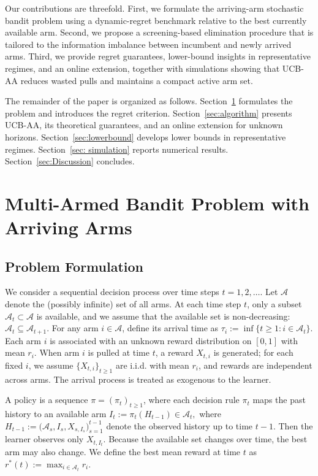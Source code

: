 \documentclass[
  12pt]{article}
\begin{document}
Our contributions are threefold. First, we formulate the arriving-arm stochastic bandit problem using a dynamic-regret benchmark relative to the best currently available arm. Second, we propose a screening-based elimination procedure that is tailored to the information imbalance between incumbent and newly arrived arms. Third, we provide regret guarantees, lower-bound insights in representative regimes, and an online extension, together with simulations showing that UCB-AA reduces wasted pulls and maintains a compact active arm set.

The remainder of the paper is organized as follows. Section~\ref{sec:problem} formulates the problem and introduces the regret criterion. Section~\ref{sec:algorithm} presents UCB-AA, its theoretical guarantees, and an online extension for unknown horizons. Section~\ref{sec:lowerbound} develops lower bounds in representative regimes. Section~\ref{sec: simulation} reports numerical results. Section~\ref{sec:Discussion} concludes.




\section{Multi-Armed Bandit Problem with Arriving Arms }
\label{sec:problem}


\subsection{Problem Formulation}

We consider a sequential decision process over time steps $t = 1, 2, \dots$. Let $\mathcal{A}$ denote the (possibly infinite) set of all arms. At each time step $t$, only a subset $\mathcal{A}_t \subset \mathcal{A}$ is available, and we assume that the available set is non-decreasing:
$\mathcal{A}_t \subseteq \mathcal{A}_{t+1}.$
For any arm $i \in \mathcal{A}$, define its arrival time as
$\tau_i := \inf\{t\ge 1: i \in \mathcal{A}_t\}$.
Each arm $i$ is associated with an unknown reward distribution on $[0,1]$ with mean $r_i$. When arm $i$ is pulled at time $t$, a reward $X_{t,i}$ is generated; for each fixed $i$, we assume $\{X_{t,i}\}_{t\ge 1}$ are i.i.d. with mean $r_i$, and rewards are independent across arms. The arrival process is treated as exogenous to the learner.

A policy is a sequence $\pi = (\pi_t)_{t\ge 1}$, where each decision rule $\pi_t$ maps the past history to an available arm $I_t := \pi_t(H_{t-1}) \in \mathcal{A}_t,$ where $H_{t-1} := \big(\mathcal{A}_s, I_s, X_{s,I_s}\big)_{s=1}^{t-1}$
denote the observed history up to time $t-1$. Then the learner observes only $X_{t,I_t}$. Because the available set changes over time, the best arm may also change. We define the best mean reward at time $t$ as
$r^*(t) := \max_{i \in \mathcal{A}_t} r_i.$
\end{document}
